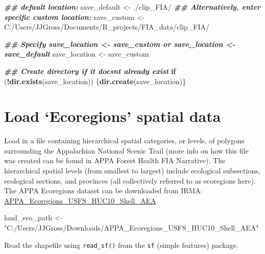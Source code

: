 \documentclass[
]{book}
\newenvironment{Shaded}{\begin{snugshade}}{\end{snugshade}}
\newcommand{\ControlFlowTok}[1]{\textcolor[rgb]{0.13,0.29,0.53}{\textbf{#1}}}
\newcommand{\DocumentationTok}[1]{\textcolor[rgb]{0.56,0.35,0.01}{\textbf{\textit{#1}}}}
\newcommand{\FunctionTok}[1]{\textcolor[rgb]{0.13,0.29,0.53}{\textbf{#1}}}
\newcommand{\NormalTok}[1]{#1}
\newcommand{\OtherTok}[1]{\textcolor[rgb]{0.56,0.35,0.01}{#1}}
\newcommand{\SpecialCharTok}[1]{\textcolor[rgb]{0.81,0.36,0.00}{\textbf{#1}}}
\newcommand{\StringTok}[1]{\textcolor[rgb]{0.31,0.60,0.02}{#1}}
\begin{document}
\begin{Shaded}
\begin{Highlighting}[]
\DocumentationTok{\#\# default location:}
\NormalTok{save\_default }\OtherTok{\textless{}{-}} \StringTok{\textquotesingle{}./clip\_FIA/\textquotesingle{}} 
\DocumentationTok{\#\# Alternatively, enter specific custom location:}
\NormalTok{save\_custom }\OtherTok{\textless{}{-}} \StringTok{\textquotesingle{}C:/Users/JJGross/Documents/R\_projects/FIA\_data/clip\_FIA/\textquotesingle{}}

\DocumentationTok{\#\# Specify \textasciigrave{}save\_location \textless{}{-} save\_custom\textasciigrave{} or \textasciigrave{}save\_location \textless{}{-} save\_default\textasciigrave{}}
\NormalTok{save\_location }\OtherTok{\textless{}{-}}\NormalTok{ save\_custom}

\DocumentationTok{\#\# Create directory if it doesn\textquotesingle{}t already exist}
\ControlFlowTok{if}\NormalTok{ (}\SpecialCharTok{!}\FunctionTok{dir.exists}\NormalTok{(save\_location)) \{}\FunctionTok{dir.create}\NormalTok{(save\_location)\}}
\end{Highlighting}
\end{Shaded}

\hypertarget{load-ecoregions-spatial-data}{%
\section{Load `Ecoregions' spatial data}\label{load-ecoregions-spatial-data}}

Load in a file containing hierarchical spatial categories, or levels, of polygons surrounding the Appalachian National Scenic Trail (more info on how this file was created can be found in APPA Forest Health FIA Narrative). The hierarchical spatial levels (from smallest to largest) include ecological subsections, ecological sections, and provinces (all collectively referred to as ecoregions here). The APPA Ecoregions dataset can be downloaded from IRMA: \href{https://irma.nps.gov/DataStore/Reference/Profile/2259589}{APPA\_Ecoregions\_USFS\_HUC10\_Shell\_AEA}

\begin{Shaded}
\begin{Highlighting}[]
\NormalTok{load\_eco\_path }\OtherTok{\textless{}{-}} \StringTok{"C:/Users/JJGross/Downloads/APPA\_Ecoregions\_USFS\_HUC10\_Shell\_AEA"}
\end{Highlighting}
\end{Shaded}

Read the shapefile using \texttt{read\_sf()} from the \texttt{sf} (simple features) package.
\end{document}
